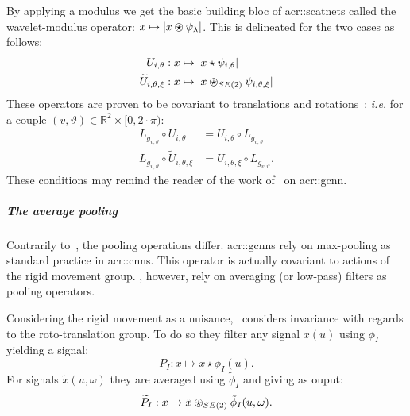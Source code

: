                     By applying a modulus we get the basic building bloc of \glspl{acr::scatnet} called the wavelet-modulus operator: $x \mapsto \vert x\ostar\psi_{\lambda} \vert$.
                    This is delineated for the two cases as follows:
                    \begin{align}
                        \label{eq::wavelet-modulus_1_2}
                        U_{i, \theta}: x &\mapsto \vert x\star\psi_{i, \theta}\vert\\
                        \widetilde{U}_{i, \theta, \xi}: x &\mapsto \vert x\ostar_{SE(2)}\psi_{i, \theta, \xi} \vert
                    \end{align}
                    These operators are proven to be covariant to translations and rotations~\parencite{mallat2012group,sifre2013rotation}: \textit{i.e.} for a couple $(v, \vartheta) \in \mathbb{R}^2 \times [0, 2\cdot\pi)$:
                    \begin{align}
                        \label{eq::covariance_wavelet-modulus}
                        L_{g_{v, \vartheta}} \circ U_{i, \theta} &= U_{i, \theta} \circ L_{g_{v, \vartheta}}\\
                        L_{g_{v, \vartheta}} \circ \widetilde{U}_{i, \theta, \xi} &= U_{i, \theta, \xi} \circ L_{g_{v, \vartheta}}.
                    \end{align}
                    These conditions may remind the reader of the work of~\textcite{cohen2016group} on \gls{acr::gcnn}.
                
                \subparagraph{The average pooling}
                    Contrarily to~\parencite{cohen2016group}, the pooling operations differ.
                    \glspl{acr::gcnn} rely on max-pooling as standard practice in \glspl{acr::cnn}.
                    This operator is actually covariant to actions of the rigid movement group.
                    \parencite{bruna2013invariant, sifre2013rotation,oyallon2015deep}, however, rely on averaging (or low-pass) filters as pooling operators.

                    Considering the rigid movement as a nuisance,~\parencite{sifre2013rotation} considers invariance with regards to the roto-translation group.
                    To do so they filter any signal $x(u)$ using $\phi_I$ yielding a signal:
                    \begin{equation}
                        \label{eq::pool_bi-dim}
                        P_I: x \mapsto x \star \phi_I (u).
                    \end{equation}
                    For signals $\tilde{x}(u, \omega)$ they are averaged using $\tilde{\phi}_I$ and giving as ouput:
                    \begin{equation}
                        \label{eq::pool_bi-dim-angular}
                        \widetilde{P}_I: x \mapsto \tilde{x} \ostar_{SE(2)} \tilde{\phi}_I (u, \omega).
                    \end{equation}

